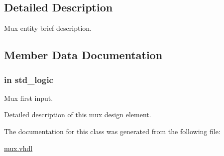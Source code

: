 \subsection{Detailed Description}
Mux entity brief description. 

\subsection{Member Data Documentation}
\hypertarget{classmux__using__with_a1732d44e0bff1ba014f2c647bc5d6879}{
\subsubsection[{din\-\_\-0}]{ {\bfseries \textcolor{vhdlkeyword}{in}\textcolor{vhdlchar}{ }} {\bfseries \textcolor{comment}{std\-\_\-logic}\textcolor{vhdlchar}{ }} \hspace{0.3cm}{\ttfamily [Port]}}}\label{classmux__using__with_a1732d44e0bff1ba014f2c647bc5d6879}


Mux first input. 

Detailed description of this mux design element. 

The documentation for this class was generated from the following file\-:\begin{DoxyCompactItemize}
\item 
\hyperlink{mux_8vhdl}{mux.\-vhdl}\end{DoxyCompactItemize}
